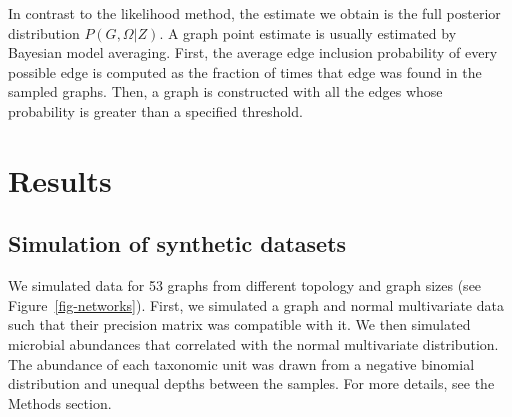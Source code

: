 \documentclass[
  a4paper,
]{article}
\begin{document}
In contrast to the likelihood method, the estimate we obtain is the full
posterior distribution \(P(G, \Omega|Z)\). A graph point estimate is
usually estimated by Bayesian model averaging. First, the average edge
inclusion probability of every possible edge is computed as the fraction
of times that edge was found in the sampled graphs. Then, a graph is
constructed with all the edges whose probability is greater than a
specified threshold.

\hypertarget{results}{%
\section{Results}\label{results}}

\hypertarget{simulation-of-synthetic-datasets}{%
\subsection{Simulation of synthetic
datasets}\label{simulation-of-synthetic-datasets}}

We simulated data for 53 graphs from different topology and graph sizes
(see Figure~\ref{fig-networks}). First, we simulated a graph and normal
multivariate data such that their precision matrix was compatible with
it. We then simulated microbial abundances that correlated with the
normal multivariate distribution. The abundance of each taxonomic unit
was drawn from a negative binomial distribution and unequal depths
between the samples. For more details, see the Methods section.
\end{document}

